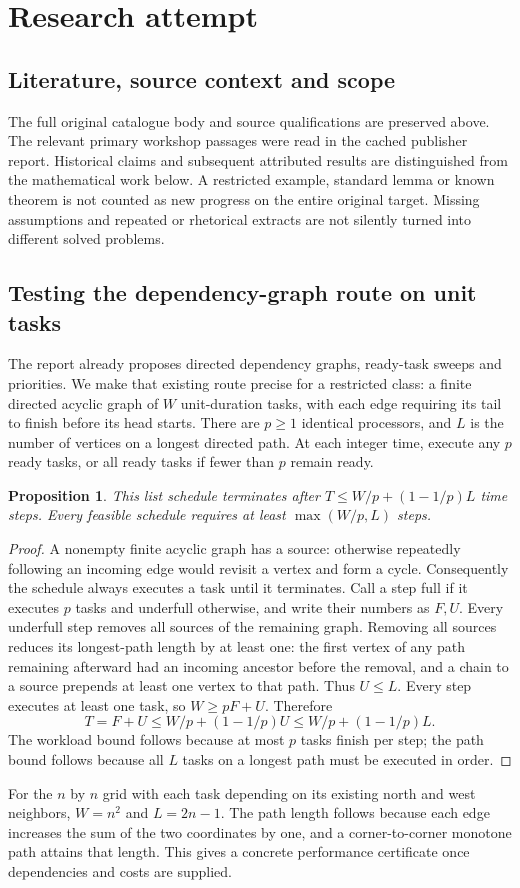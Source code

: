 \documentclass[11pt]{article}
\newtheorem{proposition}{Proposition}
\begin{document}
\section{Research attempt}
\subsection{Literature, source context and scope}
The full original catalogue body and source qualifications are preserved above. The relevant primary workshop passages were read in the cached publisher report. Historical claims and subsequent attributed results are distinguished from the mathematical work below. A restricted example, standard lemma or known theorem is not counted as new progress on the entire original target. Missing assumptions and repeated or rhetorical extracts are not silently turned into different solved problems.

\subsection{Testing the dependency-graph route on unit tasks}
The report already proposes directed dependency graphs, ready-task sweeps and priorities. We make that existing route precise for a restricted class: a finite directed acyclic graph of $W$ unit-duration tasks, with each edge requiring its tail to finish before its head starts. There are $p\ge1$ identical processors, and $L$ is the number of vertices on a longest directed path. At each integer time, execute any $p$ ready tasks, or all ready tasks if fewer than $p$ remain ready.
\begin{proposition}
This list schedule terminates after $T\le W/p+(1-1/p)L$ time steps. Every feasible schedule requires at least $\max(W/p,L)$ steps.
\end{proposition}
\begin{proof}
A nonempty finite acyclic graph has a source: otherwise repeatedly following an incoming edge would revisit a vertex and form a cycle. Consequently the schedule always executes a task until it terminates. Call a step full if it executes $p$ tasks and underfull otherwise, and write their numbers as $F,U$. Every underfull step removes all sources of the remaining graph. Removing all sources reduces its longest-path length by at least one: the first vertex of any path remaining afterward had an incoming ancestor before the removal, and a chain to a source prepends at least one vertex to that path. Thus $U\le L$. Every step executes at least one task, so $W\ge pF+U$. Therefore
\[
T=F+U\le W/p+(1-1/p)U\le W/p+(1-1/p)L.
\]
The workload bound follows because at most $p$ tasks finish per step; the path bound follows because all $L$ tasks on a longest path must be executed in order.
\end{proof}
For the $n$ by $n$ grid with each task depending on its existing north and west neighbors, $W=n^2$ and $L=2n-1$. The path length follows because each edge increases the sum of the two coordinates by one, and a corner-to-corner monotone path attains that length. This gives a concrete performance certificate once dependencies and costs are supplied.
\end{document}
